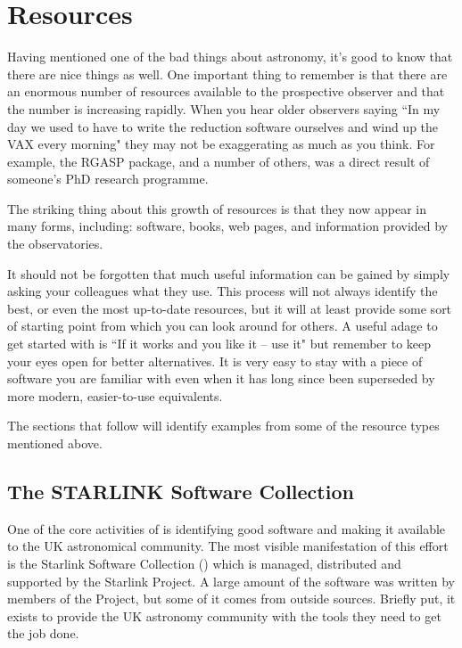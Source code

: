 \section{Resources} 
\label{sec:resources} 

Having mentioned one of the bad things about astronomy, it's good to know that
there are nice things as well. One important thing to remember is that there
are an enormous number of resources available to the prospective observer and
that the number is increasing rapidly. When you hear older observers saying
``In my day we used to have to write the reduction software ourselves and wind
up the VAX every morning" they may not be exaggerating as much as you think.
For example, the RGASP package, and a number of others, was a direct result of 
someone's PhD research programme.

The striking thing about this growth of resources is that they now appear in
many forms, including: software, books, web pages, and information provided by
the observatories. 

It should not be forgotten that much useful information can be gained by
simply asking your colleagues what they use. This process will not always
identify the best, or even the most up-to-date resources, but it will at
least provide some sort of starting point from which you can look around for
others. A useful adage to get started with is ``If it works and you like it --
use it" but remember to keep your eyes open for better alternatives. It is
very easy to stay with a piece of software you are familiar with even when it
has long since been superseded by more modern, easier-to-use equivalents. 

The sections that follow will identify examples from some of the 
resource types mentioned above. 


\subsection{The STARLINK Software Collection} 
\label{sec:starlink}
 
One of the core activities of {\STARLINKref} is identifying 
good software and making it available to the UK astronomical 
community. The most visible manifestation of this
effort is the Starlink Software Collection ({\SSCref}) which is managed, 
distributed and supported by the Starlink Project. A large amount of the 
software was written by members of the Project, but some of it comes from 
outside sources. Briefly put, it exists to provide the UK astronomy 
community with the tools they need to get the job done. 

